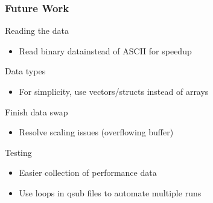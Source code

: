 \documentclass{beamer}
\begin{document}
\begin{frame}	
	\frametitle{Future Work}
	
	\begin{block}{Reading the data}
		\begin{itemize}
			\item Read binary datainstead of ASCII for speedup
		\end{itemize}
	\end{block}
	
	\begin{block}{Data types}
		\begin{itemize}
			\item For simplicity, use vectors/structs instead of arrays
		\end{itemize}
	\end{block}
	
	\begin{block}{Finish data swap}
		\begin{itemize}
			\item Resolve scaling issues (overflowing buffer)
		\end{itemize}
	\end{block}
	
	\begin{block}{Testing}
		\begin{itemize}
			\item Easier collection of performance data
			\item Use loops in qsub files to automate multiple runs
		\end{itemize}
	\end{block}
	
\end{frame}



\end{document}
